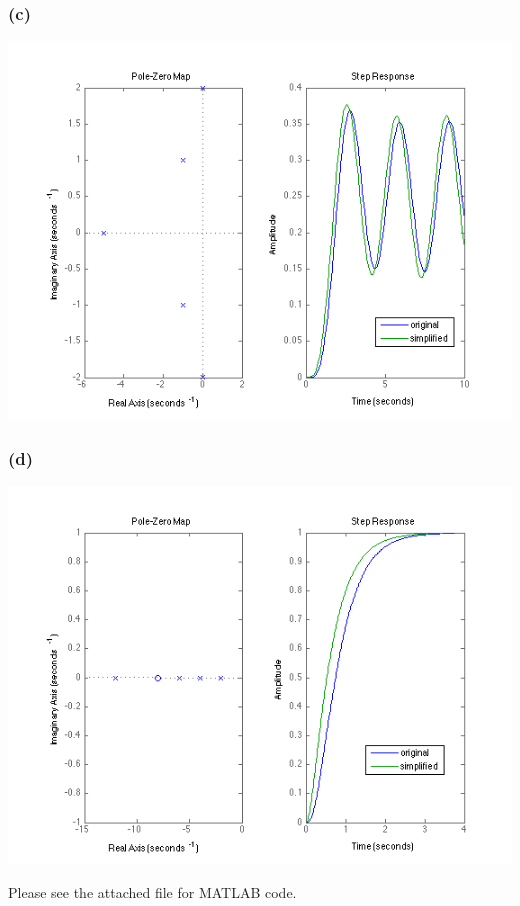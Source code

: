 \documentclass[letterpaper,10pt]{article}
\begin{document}
\subsubsection*{(c)}
\begin{center}
	\includegraphics[scale=0.5]{homework03-2c.png}
\end{center}
\subsubsection*{(d)}
\begin{center}
	\includegraphics[scale=0.5]{homework03-2d.png}
\end{center}
Please see the attached file for MATLAB code.
\end{document}

